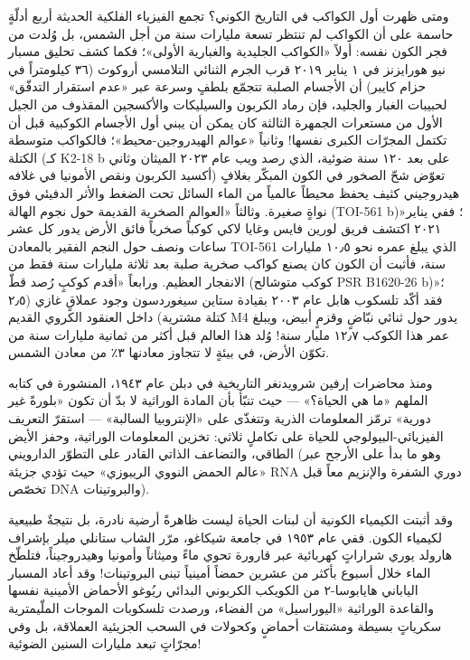 \documentclass[12pt,a4paper,openany]{book}
\begin{document}
ومتى ظهرت أول الكواكب في التاريخ الكوني؟ تجمع الفيزياء الفلكية الحديثة أربع أدلّةٍ حاسمة على أن الكواكب لم تنتظر تسعة مليارات سنة من أجل الشمس، بل وُلدت من فجر الكون نفسه: أولاً «الكواكب الجليدية والغبارية الأولى»؛ فكما كشف تحليق مسبار نيو هورايزنز في ١ يناير ٢٠١٩ قرب الجرم الثنائي التلامسي أروكوث (٣٦ كيلومتراً في حزام كايبر) أن الأجسام الصلبة تتجمّع بلطفٍ وسرعة عبر «عدم استقرار التدفّق» لحبيبات الغبار والجليد، فإن رماد الكربون والسيليكات والأكسجين المقذوف من الجيل الأول من مستعرات الجمهرة الثالثة كان يمكن أن يبني أول الأجسام الكوكبية قبل أن تكتمل المجرّات الكبرى نفسها! وثانياً «عوالم الهيدروجين-محيط»؛ فالكواكب متوسطة الكتلة (كـ K2-18 b على بعد ١٢٠ سنة ضوئية، الذي رصد ويب عام ٢٠٢٣ الميثان وثاني أكسيد الكربون ونقص الأمونيا في غلافه) تعوّض شحّ الصخور في الكون المبكّر بغلافٍ هيدروجيني كثيف يحفظ محيطاً عالمياً من الماء السائل تحت الضغط والأثر الدفيئي فوق نواةٍ صغيرة. وثالثاً «العوالم الصخرية القديمة حول نجوم الهالة (TOI-561 b)»؛ ففي يناير ٢٠٢١ اكتشف فريق لورين فايس وغايا لاكي كوكباً صخرياً فائق الأرض يدور كل عشر ساعات ونصف حول النجم الفقير بالمعادن TOI-561 الذي يبلغ عمره نحو ١٠٫٥ مليارات سنة، فأثبت أن الكون كان يصنع كواكب صخرية صلبة بعد ثلاثة مليارات سنة فقط من الانفجار العظيم. ورابعاً «أقدم كوكبٍ رُصد قطّ (كوكب متوشالح PSR B1620-26 b)»؛ فقد أكّد تلسكوب هابل عام ٢٠٠٣ بقيادة ستاين سيغوردسون وجود عملاقٍ غازي (٢٫٥ كتلة مشترية) داخل العنقود الكروي القديم M4 يدور حول ثنائي نبّاضٍ وقزمٍ أبيض، ويبلغ عمر هذا الكوكب ١٢٫٧ مليار سنة! وُلد هذا العالم قبل أكثر من ثمانية مليارات سنة من تكوّن الأرض، في بيئةٍ لا تتجاوز معادنها ٣٪ من معادن الشمس.


ومنذ محاضرات إرفين شرويدنغر التاريخية في دبلن عام ١٩٤٣، المنشورة في كتابه الملهم «ما هي الحياة؟» — حيث تنبّأ بأن المادة الوراثية لا بدّ أن تكون «بلورةً غير دورية» ترمّز المعلومات الذرية وتتغذّى على «الإنتروبيا السالبة» — استقرّ التعريف الفيزيائي-البيولوجي للحياة على تكاملٍ ثلاثي: تخزين المعلومات الوراثية، وحفز الأيض الطاقي، والتضاعف الذاتي القادر على التطوّر الدارويني (وهو ما بدأ على الأرجح عبر «عالم الحمض النووي الريبوزي» حيث تؤدي جزيئة RNA دوري الشفرة والإنزيم معاً قبل تخصّص DNA والبروتينات).


وقد أثبتت الكيمياء الكونية أن لبنات الحياة ليست ظاهرةً أرضية نادرة، بل نتيجةٌ طبيعية لكيمياء الكون. ففي عام ١٩٥٣ في جامعة شيكاغو، مرّر الشاب ستانلي ميلر بإشراف هارولد يوري شراراتٍ كهربائية عبر قارورة تحوي ماءً وميثاناً وأمونيا وهيدروجيناً، فتلطّخ الماء خلال أسبوع بأكثر من عشرين حمضاً أمينياً تبنى البروتينات! وقد أعاد المسبار الياباني هايابوسا-٢ من الكويكب الكربوني البدائي ريُوغو الأحماض الأمينية نفسها والقاعدة الوراثية «اليوراسيل» من الفضاء، ورصدت تلسكوبات الموجات الملّيمترية سكرياتٍ بسيطة ومشتقات أحماضٍ وكحولات في السحب الجزيئية العملاقة، بل وفي مجرّاتٍ تبعد مليارات السنين الضوئية!
\end{document}
